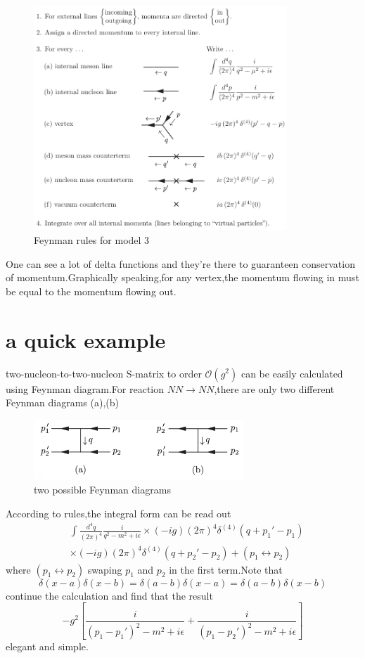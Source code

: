 \documentclass[a4paper]{article}
\begin{document}
\begin{figure}[htbp]
	\centering
	\includegraphics[width=0.85\textwidth]{6.png}
	\caption{Feynman rules for model 3}
\end{figure}

One can see a lot of delta functions and they're there to guaranteen conservation of momentum.Graphically speaking,for any vertex,the momentum flowing in must be equal to the momentum flowing out.
\section{a quick example}
two-nucleon-to-two-nucleon S-matrix to order $\mathscr{O}(g^2)$ can be easily calculated using Feynman diagram.For reaction $NN\rightarrow NN$,there are only two different Feynman diagrams (a),(b)
\begin{figure}[htbp]
	\centering
	\includegraphics[width=0.7\textwidth]{7.png}
	\caption{two possible Feynman diagrams}
\end{figure}

According to rules,the integral form can be read out
\begin{align*}
	&\int\frac{d^4q}{(2\pi)^4}\frac{i}{q^2-m^2+i\epsilon}\times(-ig)(2\pi)^4\delta^{(4)}(q+p_1'-p_1)\\&\times(-ig)(2\pi)^4\delta^{(4)}(q+p_2'-p_2)+(p_1\leftrightarrow p_2)
\end{align*}
where $(p_1\leftrightarrow p_2)$ swaping $p_1$ and $p_2$ in the first term.Note that$$\delta(x-a)\delta(x-b)=\delta(a-b)\delta(x-a)=\delta(a-b)\delta(x-b)$$continue the calculation and find that the result$$-g^2[\frac{i}{(p_1-p_1')^2-m^2+i\epsilon}+\frac{i}{(p_1-p_2')^2-m^2+i\epsilon}]$$
elegant and simple.
\end{document}
